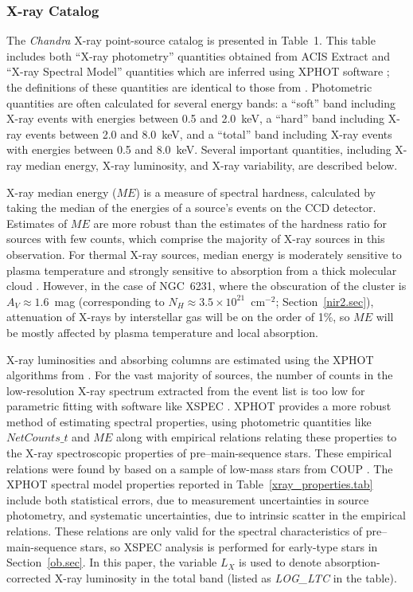 \documentclass[twocolumn,tighten]{aastex61}
\newcounter{column_number}
\begin{document}
\subsubsection{X-ray Catalog}

The {\it Chandra} X-ray point-source catalog is presented in Table~1. This table includes both ``X-ray photometry'' quantities obtained from ACIS Extract and ``X-ray Spectral Model'' quantities which are inferred using XPHOT software \citep{2010ApJ...708.1760G}; the definitions of these quantities are identical to those from \citet[][their Table~4]{2013ApJS..209...27K}. 
Photometric quantities are often calculated for several energy bands: a ``soft'' band including X-ray events with energies between 0.5 and 2.0~keV, a ``hard'' band including X-ray events between 2.0 and 8.0~keV, and a ``total'' band including X-ray events with energies between 0.5 and 8.0~keV. Several important quantities, including X-ray median energy, X-ray luminosity, and X-ray variability, are described below. 

X-ray median energy ($ME$) is a measure of spectral hardness, calculated by taking the median of the energies of a source's events on the CCD detector. Estimates of $ME$ are more robust than the estimates of the hardness ratio for sources with few counts, which comprise the majority of X-ray sources in this observation. For thermal X-ray sources, median energy is moderately sensitive to plasma temperature and strongly sensitive to absorption from a thick molecular cloud \citep{2010ApJ...708.1760G}. However, in the case of NGC~6231, where the obscuration of the cluster is $A_V\approx1.6$~mag (corresponding to $N_H\approx3.5\times10^{21}$~cm$^{-2}$; Section~\ref{nir2.sec}), attenuation of X-rays by interstellar gas will be on the order of 1\%, so $ME$ will be mostly affected by plasma temperature and local absorption.

X-ray luminosities and absorbing columns are estimated using the XPHOT algorithms from \citet{2010ApJ...708.1760G}. For the vast majority of sources, the number of counts in the low-resolution X-ray spectrum extracted from the event list is too low for parametric fitting with software like XSPEC \citep{1996ASPC..101...17A}. XPHOT provides a more robust method of estimating spectral properties, using photometric quantities like $NetCounts\_t$ and $ME$ along with empirical relations relating these properties to the X-ray spectroscopic properties of pre--main-sequence stars. These empirical relations were found by \citeauthor{2010ApJ...708.1760G} based on a sample of low-mass stars from COUP \citep{2005ApJS..160..319G,2005ApJS..160..379F}. The XPHOT spectral model properties reported in Table~\ref{xray_properties.tab} include both statistical errors, due to measurement uncertainties in source photometry, and systematic uncertainties, due to intrinsic scatter in the empirical relations. These relations are only valid for the spectral characteristics of pre--main-sequence stars, so XSPEC analysis is performed for early-type stars in Section~\ref{ob.sec}. In this paper, the variable $L_X$ is used to denote absorption-corrected X-ray luminosity in the total band (listed as {\it LOG\_LTC} in the table).
\end{document}
